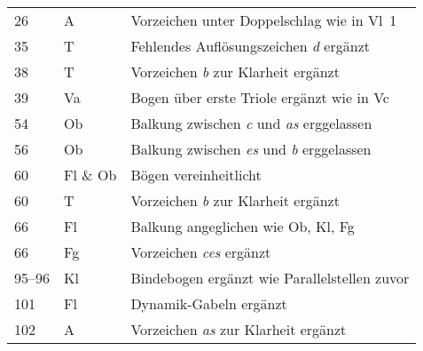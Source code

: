 \documentclass[a4paper,9pt]{extarticle}
\newcommand{\note}[1]{\textsl{#1}}
\begin{document}
\begin{center}
\begin{tabular}{lll}
26 & A & Vorzeichen unter Doppelschlag wie in Vl~1\\
35 & T & Fehlendes Auflösungszeichen \note{d} ergänzt\\
38 & T & Vorzeichen \note{b} zur Klarheit ergänzt\\
39 & Va & Bogen über erste Triole ergänzt wie in Vc\\
54 & Ob & Balkung zwischen \note{c} und \note{as} erggelassen\\
56 & Ob & Balkung zwischen \note{es} und \note{b} erggelassen\\
60 & Fl \& Ob & Bögen vereinheitlicht\\
60 & T & Vorzeichen \note{b} zur Klarheit ergänzt\\
66 & Fl & Balkung angeglichen wie Ob, Kl, Fg\\
66 & Fg & Vorzeichen \note{ces} ergänzt\\
95--96 & Kl & Bindebogen ergänzt wie Parallelstellen zuvor\\
101 & Fl & Dynamik-Gabeln ergänzt\\
102 & A & Vorzeichen \note{as} zur Klarheit ergänzt\\

\bottomrule
\end{tabular}

\end{center}
\end{document}
